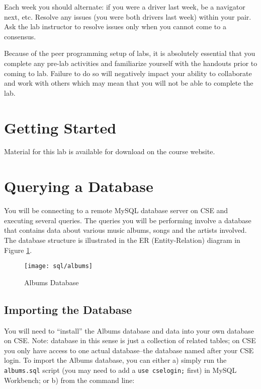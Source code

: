 \documentclass[12pt]{scrartcl}
\begin{document}
Each week you should alternate: if you were a driver last week, 
be a navigator next, etc.  Resolve any issues (you were both drivers
last week) within your pair.  Ask the lab instructor to resolve issues
only when you cannot come to a consensus.  

Because of the peer programming setup of labs, it is absolutely 
essential that you complete any pre-lab activities and familiarize
yourself with the handouts prior to coming to lab.  Failure to do
so will negatively impact your ability to collaborate and work with 
others which may mean that you will not be able to complete the
lab.  

\section*{Getting Started}

Material for this lab is available for download on the course website.

\section*{Querying a Database}

You will be connecting to a remote MySQL database server on CSE 
and executing several queries.  The queries you will be performing 
involve a database that contains data about various music albums, songs
and the artists involved.  The database structure is illustrated 
in the ER (Entity-Relation) diagram in Figure \ref{figure:albumDB}.

\begin{figure}[h]
\centering
\texttt{[image: sql/albums]}
\caption{Albums Database}
\label{figure:albumDB}
\end{figure}

\subsection*{Importing the Database}

You will need to ``install'' the Albums database and data into your 
own database on CSE.  Note: database in this sense is just a collection 
of related tables; on CSE you only have access to one actual 
database--the database named after your CSE login.  To import the 
Albums database, you can either a) simply run the \texttt{albums.sql}
script (you may need to add a \texttt{use cselogin;} first)
in MySQL Workbench; or b) from the command line:
\end{document}
